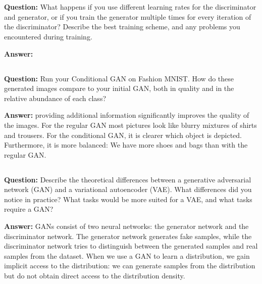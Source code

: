 \documentclass{article}
\begin{document}
\section{}
\subsection{}
\subsection{}

\textbf{Question: }What happens if you use different learning rates for the discriminator and generator, or if you train the
generator multiple times for every iteration of the discriminator? Describe the best training scheme,
and any problems you encountered during training. 


\textbf{Answer:}
\todo{}
\subsection{}
\subsection{}
\subsection{}
\textbf{Question: } Run your Conditional GAN on Fashion MNIST. How do these generated images compare to your initial GAN, both in quality and in the relative abundance of each class?

\textbf{Answer: } providing additional information significantly improves the quality of the images. For the regular GAN most pictures look like blurry mixtures of shirts and trousers. For the conditional GAN, it is clearer which object is depicted. Furthermore, it is more balanced: We have more shoes and bags than with the regular GAN.

\subsection{}
\textbf{Question: } Describe the theoretical differences between a generative adversarial network (GAN) and a variational
autoencoder (VAE). What differences did you notice in practice? What tasks would be more suited
for a VAE, and what tasks require a GAN?

\textbf{Answer:}
GANs consist of two neural networks: the generator network and the discriminator network. The generator network generates fake samples, while the discriminator network tries to distinguish between the generated samples and real samples from the dataset. When we use a GAN to learn a distribution, we gain implicit access to the distribution: we can generate samples from the distribution but do not obtain direct access to the distribution density.
\end{document}
